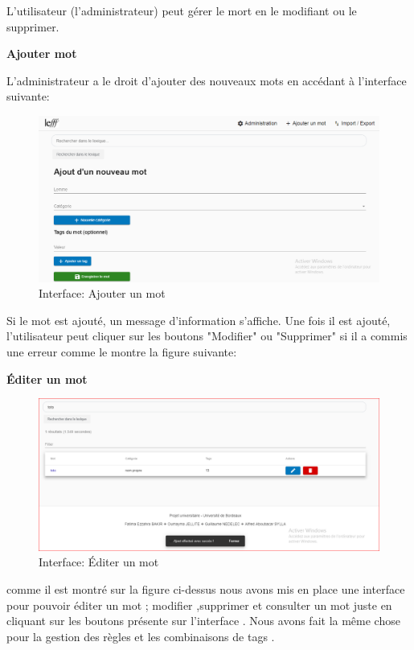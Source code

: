\documentclass[12pt,a4paper]{article}
\begin{document}
    L’utilisateur (l’administrateur) peut gérer le mort en le modifiant ou le supprimer.

    \textbf{ Ajouter mot}

    L'administrateur a le droit d'ajouter des nouveaux mots en accédant à l'interface suivante:

    \begin{figure}[h]
        \centering
        \includegraphics[width=150mm]{img/Ajoutermot.PNG}
        \caption{Interface: Ajouter un mot}
        \label{Tux}
    \end{figure}

    Si le mot est ajouté, un message d'information s'affiche. Une fois il est ajouté, l'utilisateur peut cliquer sur les boutons "Modifier" ou "Supprimer" si il a commis une erreur comme le montre la figure suivante:

    \textbf{Éditer un mot}
    \begin{figure}[h]
        \centering
        \includegraphics[width=150mm]{img/AjoutEffectuer.PNG}
        \caption{Interface: Éditer un mot}
        \label{Tux}
    \end{figure}

    comme il est montré sur la figure ci-dessus nous avons mis en place une interface pour pouvoir éditer un mot ; modifier ,supprimer et consulter un mot juste en cliquant sur les boutons présente sur l'interface .
    Nous avons fait la même chose pour la gestion des règles et les combinaisons de tags .
\end{document}
